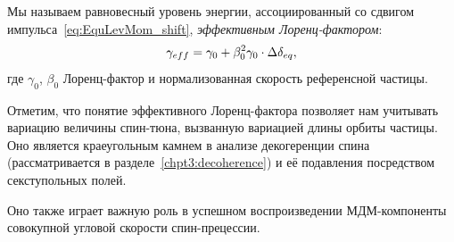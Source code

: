 Мы называем равновесный уровень энергии, ассоциированный со сдвигом импульса~\eqref{eq:EquLevMom_shift},
\emph{эффективным Лоренц-фактором}:
\begin{equation}\label{eq:EffectiveGamma}
\g*= \gamma_0 + \beta_0^2\gamma_0\cdot\Delta\delta_{eq},
\end{equation}
где $\gamma_0$, $\beta_0$ Лоренц-фактор и нормализованная скорость референсной частицы.

Отметим, что понятие эффективного Лоренц-фактора позволяет нам учитывать вариацию величины спин-тюна,
вызванную вариацией длины орбиты частицы. Оно является краеугольным камнем в анализе 
декогеренции спина (рассматривается в разделе~\ref{chpt3:decoherence}) и её подавления посредством секступольных полей.

Оно также играет важную роль в успешном воспроизведении МДМ-компоненты совокупной угловой скорости
спин-прецессии.